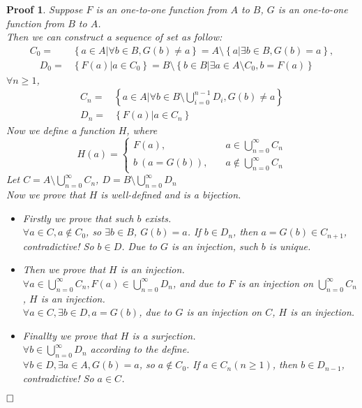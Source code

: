 \documentclass{ctexart}
\newcommand{\。}{．} %
\newenvironment{lanse}{
    \begin{tcolorbox}[enhanced, breakable, colback=qlan, boxrule=0pt, frame hidden,
        borderline west={0.7mm}{0.1mm}{slan}]
    }
    {\end{tcolorbox}}
\theoremstyle{t} %
\newtheorem*{zmhj}{\color{slan} Proof}
\newenvironment{zm}{\begin{lanse}\begin{zmhj}}{$\hfill \square$\end{zmhj}\end{lanse}}
\begin{document}
\begin{zm}
    Suppose $F$ is an one-to-one function from $A$ to $B$, $G$ is an one-to-one function from $B$ to $A$. \\
    Then we can construct a sequence of set as follow:
    \begin{align*}
        C_0 =& \left\{a \in A | \forall b \in B, G(b) \neq a\right\} = A \setminus \left\{a | \exists b \in B, G(b) = a\right\}, \\
        \quad D_0 =& \left\{F(a) | a \in C_0\right\} =B \setminus \left\{b \in B | \exists a \in A \setminus C_0 , b = F(a) \right\}
    \end{align*}
    $\forall n \geqslant 1$,
    \begin{align*}
        C_n =& \left\{a \in A \vert \forall b \in B \setminus \bigcup_{i = 0}^{n - 1}D_i, G(b) \neq a\right\} \\
        D_n =& \left\{F(a) \vert a \in C_n \right\} 
    \end{align*}
    Now we define a function $H$, where \\
    \[H(a) = \begin{cases}
        F(a), & \quad a \in \bigcup_{n = 0}^{\infty}C_n \\
        b\ (a = G(b)), & \quad a \notin \bigcup_{n = 0}^{\infty}C_n
    \end{cases}\]
    Let $C = A \setminus \bigcup_{n = 0}^{\infty}C_n$, $D = B \setminus \bigcup_{n = 0}^{\infty}D_n$ \\
    Now we prove that $H$ is well-defined and is a bijection.
    \begin{itemize}
        \item Firstly we prove that such $b$ exists. \\
        $\forall a \in C, a \notin C_0$, so $\exists b \in B$, $G(b) = a$. If $b \in D_n$, then $a = G(b) \in C_{n + 1}$, contradictive! So $b \in D$. Due to $G$ is an injection, such $b$ is unique.
        \item Then we prove that $H$ is an injection. \\
        $\forall a \in \bigcup_{n = 0}^{\infty}C_n, F(a) \in \bigcup_{n = 0}^{\infty}D_n$, and due to $F$ is an injection on $\bigcup_{n = 0}^{\infty}C_n$, $H$ is an injection. \\
        $\forall a \in C, \exists b \in D, a = G(b)$, due to $G$ is an injection on $C$, $H$ is an injection. 
        \item Finallty we prove that $H$ is a surjection. \\
        $\forall b \in \bigcup_{n = 0}^{\infty}D_n$ according to the define. \\
         $\forall b \in D, \exists a \in A, G(b) = a$, so $a \notin C_0$. If $a \in C_n (n \geqslant 1) $, then $b \in D_{n - 1}$, contradictive! So $a \in C$.
    \end{itemize}
\end{zm}
\end{document}
